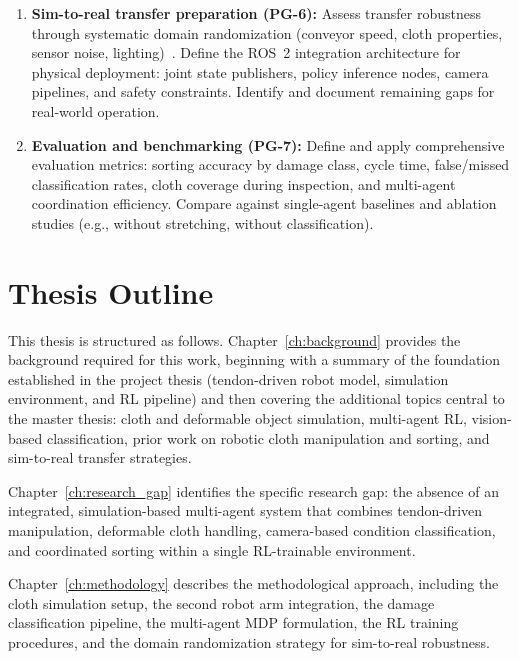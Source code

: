 \begin{enumerate}
  \item \textbf{Sim-to-real transfer preparation (PG-6):}
  Assess transfer robustness through systematic domain randomization (conveyor speed, cloth properties, sensor noise, lighting)~\cite{Tobin2017DomainRand,Peng2018DynamicsRandomization}. Define the \ac{ROS}~2 integration architecture for physical deployment: joint state publishers, policy inference nodes, camera pipelines, and safety constraints. Identify and document remaining gaps for real-world operation.

  \item \textbf{Evaluation and benchmarking (PG-7):}
  Define and apply comprehensive evaluation metrics: sorting accuracy by damage class, cycle time, false/missed classification rates, cloth coverage during inspection, and multi-agent coordination efficiency. Compare against single-agent baselines and ablation studies (e.g., without stretching, without classification).
\end{enumerate}

\section{Thesis Outline}

This thesis is structured as follows.
Chapter~\ref{ch:background} provides the background required for this work, beginning with a summary of the foundation established in the project thesis (tendon-driven robot model, simulation environment, and \ac{RL} pipeline) and then covering the additional topics central to the master thesis: cloth and deformable object simulation, multi-agent \ac{RL}, vision-based classification, prior work on robotic cloth manipulation and sorting, and sim-to-real transfer strategies.

Chapter~\ref{ch:research_gap} identifies the specific research gap: the absence of an integrated, simulation-based multi-agent system that combines tendon-driven manipulation, deformable cloth handling, camera-based condition classification, and coordinated sorting within a single \ac{RL}-trainable environment.

Chapter~\ref{ch:methodology} describes the methodological approach, including the cloth simulation setup, the second robot arm integration, the damage classification pipeline, the multi-agent \ac{MDP} formulation, the \ac{RL} training procedures, and the domain randomization strategy for sim-to-real robustness.

